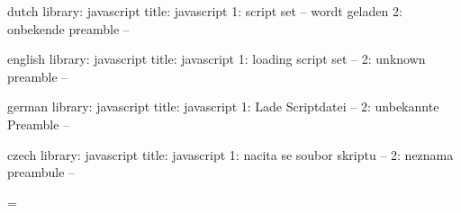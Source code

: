 



 

\unprotect


\startmessages  dutch  library: javascript
  title: javascript
      1: script set -- wordt geladen
      2: onbekende preamble --
\stopmessages

\startmessages  english  library: javascript
  title: javascript
      1: loading script set --
      2: unknown preamble --
\stopmessages

\startmessages  german  library: javascript
  title: javascript
      1: Lade Scriptdatei --
      2: unbekannte Preamble --
\stopmessages

\startmessages  czech  library: javascript
  title: javascript
      1: nacita se soubor skriptu --
      2: neznama preambule --
\stopmessages


\newif\iftraceJScode \traceJScodefalse

\let\traceJScode\traceJScodetrue


\bgroup
{}=\@@letter
\gdef\delcharacter{^^7f} 
\egroup

